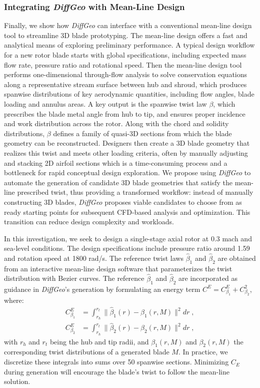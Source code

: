 

\subsubsection{Integrating \textit{DiffGeo} with Mean-Line Design}
Finally, we show how \textit{DiffGeo} can interface with a conventional mean-line design tool to streamline 3D blade prototyping. The mean-line design offers a fast and analytical means of exploring preliminary performance. A typical design workflow for a new rotor blade starts with global specifications, including expected mass flow rate, pressure ratio and rotational speed. Then the mean-line design tool performs one-dimensional through-flow analysis to solve conservation equations along a representative stream surface between hub and shroud, which produces spanwise distributions of key aerodynamic quantities, including flow angles, blade loading and annulus areas. A key output is the spanwise twist law $\beta$, which prescribes the blade metal angle from hub to tip, and ensures proper incidence and work distribution across the rotor. Along with the chord and solidity distributions, $\beta$ defines a family of quasi-3D sections from which the blade geometry can be reconstructed. Designers then create a 3D blade geometry that realizes this twist and meets other loading criteria, often by manually adjusting and stacking 2D airfoil sections which is a time-consuming process and a bottleneck for rapid conceptual design exploration. We propose using \textit{DiffGeo} to automate the generation of candidate 3D blade geometries that satisfy the mean-line prescribed twist, thus providing a transformed workflow: instead of manually constructing 3D blades, \textit{DiffGeo} proposes viable candidates to choose from as ready starting points for subsequent CFD-based analysis and optimization. This transition can reduce design complexity and workloads.

In this investigation, we seek to design a single-stage axial rotor at 0.3 mach and sea-level conditions. The design specifications include pressure ratio around 1.59 and rotation speed at 1800 rad/s. The reference twist laws $\hat{\beta}_1$ and $\hat{\beta}_2$ are obtained from an interactive mean-line design software that parameterizes the twist distribution with Bezier curves. The reference $\hat{\beta}_1$ and $\hat{\beta}_2$ are incorporated as guidance in \textit{DiffGeo}'s generation by formulating an energy term $C^E=C_{\beta_1}^E+C_{\beta_2}^2$, where:
\begin{align}
    C_{\beta_1}^E &= \int_{r_h}^{r_t} \bigl\|\hat{\beta}_1(r) - \beta_1(r,M)\bigr\|^2 dr \;, \nonumber \\
    C_{\beta_2}^E &= \int_{r_h}^{r_t} \bigl\|\hat{\beta}_2(r) - \beta_2(r,M)\bigr\|^2 dr \;,
    \label{ch6:eq:beta_constraint}
\end{align}
with $r_h$ and $r_t$ being the hub and tip radii, and $\beta_1(r,M)$ and $\beta_2(r,M)$ the corresponding twist distributions of a generated blade $M$. In practice, we discretize these integrals into sums over 50 spanwise sections. Minimizing $C_E$ during generation will encourage the blade’s twist to follow the mean-line solution.

